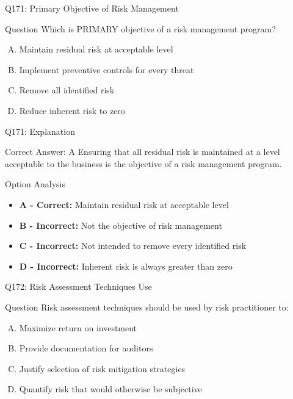 \documentclass{beamer}
\begin{document}
	\begin{frame}{Q171: Primary Objective of Risk Management}
		\begin{block}{Question}
			Which is PRIMARY objective of a risk management program?
		\end{block}
		\begin{enumerate}[(A)]
			\item Maintain residual risk at acceptable level
			\item Implement preventive controls for every threat
			\item Remove all identified risk
			\item Reduce inherent risk to zero
		\end{enumerate}
	\end{frame}
	
	\begin{frame}{Q171: Explanation}
		\begin{block}{Correct Answer: A}
			Ensuring that all residual risk is maintained at a level acceptable to the business is the objective of a risk management program.
		\end{block}
		\begin{block}{Option Analysis}
			\begin{itemize}
				\item \textbf{A - Correct:} Maintain residual risk at acceptable level
				\item \textbf{B - Incorrect:} Not the objective of risk management
				\item \textbf{C - Incorrect:} Not intended to remove every identified risk
				\item \textbf{D - Incorrect:} Inherent risk is always greater than zero
			\end{itemize}
		\end{block}
	\end{frame}
	
	\begin{frame}{Q172: Risk Assessment Techniques Use}
		\begin{block}{Question}
			Risk assessment techniques should be used by risk practitioner to:
		\end{block}
		\begin{enumerate}[(A)]
			\item Maximize return on investment
			\item Provide documentation for auditors
			\item Justify selection of risk mitigation strategies
			\item Quantify risk that would otherwise be subjective
		\end{enumerate}
	\end{frame}
	
\end{document}
